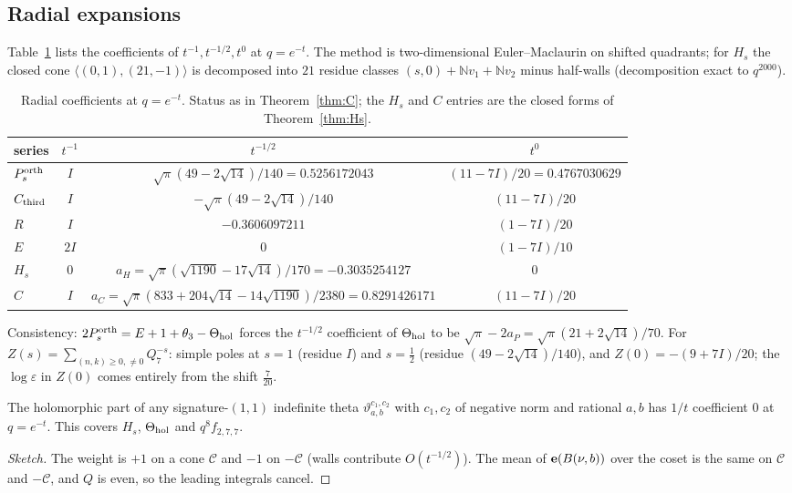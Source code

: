 \subsection{Radial expansions}
Table~\ref{tab:radial} lists the coefficients of $t^{-1},t^{-1/2},t^0$ at $q=e^{-t}$. The method is two-dimensional
Euler--Maclaurin on shifted quadrants; for $H_s$ the closed cone $\langle(0,1),(21,-1)\rangle$ is decomposed into $21$ residue
classes $(s,0)+\mathbb N v_1+\mathbb N v_2$ minus half-walls (decomposition exact to $q^{2000}$).
\begin{table}[ht]\centering\small
\begin{tabular}{lccc}\toprule
series & $t^{-1}$ & $t^{-1/2}$ & $t^0$\\\midrule
$P^{\mathrm{orth}}_s$ & $I$ & $\sqrt\pi(49-2\sqrt{14})/140=0.5256172043$ & $(11-7I)/20=0.4767030629$\\
$C_{\mathrm{third}}$ & $I$ & $-\sqrt\pi(49-2\sqrt{14})/140$ & $(11-7I)/20$\\
$R$ & $I$ & $-0.3606097211$ & $(1-7I)/20$\\
$E$ & $2I$ & $0$ & $(1-7I)/10$\\
$H_s$ & $0$ & $a_H=\sqrt\pi(\sqrt{1190}-17\sqrt{14})/170=-0.3035254127$ & $0$\\
$C$ & $I$ & $a_C=\sqrt\pi(833+204\sqrt{14}-14\sqrt{1190})/2380=0.8291426171$ & $(11-7I)/20$\\\bottomrule
\end{tabular}
\caption{Radial coefficients at $q=e^{-t}$. Status as in Theorem~\ref{thm:C}; the $H_s$ and $C$ entries are the closed forms of Theorem~\ref{thm:Hs}.}\label{tab:radial}
\end{table}
Consistency: $2P^{\mathrm{orth}}_s=E+1+\theta_3-\Theta_{\mathrm{hol}}$ forces the $t^{-1/2}$ coefficient of $\Theta_{\mathrm{hol}}$ to be $\sqrt\pi-2a_P=\sqrt\pi(21+2\sqrt{14})/70$.
For $Z(s)=\sum_{(n,k)\ge0,\ne0}Q_7^{-s}$: simple poles at $s=1$ (residue $I$) and $s=\tfrac12$ (residue $(49-2\sqrt{14})/140$), and
$Z(0)=-(9+7I)/20$; the $\log\varepsilon$ in $Z(0)$ comes entirely from the shift $\tfrac7{20}$.

\begin{lemma}\label{lem:zw0}
The holomorphic part of any signature-$(1,1)$ indefinite theta $\vartheta^{c_1,c_2}_{a,b}$ with $c_1,c_2$ of negative norm and rational
$a,b$ has $1/t$ coefficient $0$ at $q=e^{-t}$. This covers $H_s$, $\Theta_{\mathrm{hol}}$ and $q^8f_{2,7,7}$.
\end{lemma}
\begin{proof}[Sketch]
The weight is $+1$ on a cone $\mathcal C$ and $-1$ on $-\mathcal C$ (walls contribute $O(t^{-1/2})$). The mean of $\mathbf{e}(B(\nu,b))$ over the coset is the same on
$\mathcal C$ and $-\mathcal C$, and $Q$ is even, so the leading integrals cancel.
\end{proof}

